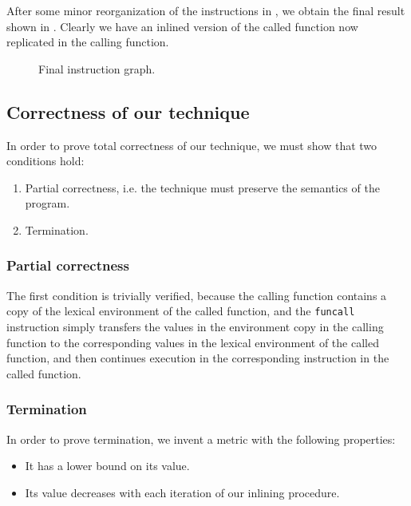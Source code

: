 After some minor reorganization of the instructions in ,
we obtain the final result shown in .  Clearly we have an
inlined version of the called function now replicated in the calling
function.

\begin{figure}
\begin{center}
\end{center}
\caption{\label{fig47}
Final instruction graph.}
\end{figure}

\subsection{Correctness of our technique}

In order to prove total correctness of our technique, we must show
that two conditions hold:

\begin{enumerate}
\item Partial correctness, i.e. the technique must preserve the
  semantics of the program.
\item Termination.
\end{enumerate}

\subsubsection{Partial correctness}

The first condition is trivially verified, because the calling
function contains a copy of the lexical environment of the called
function, and the \texttt{funcall} instruction simply transfers the
values in the environment copy in the calling function to the
corresponding values in the lexical environment of the called
function, and then continues execution in the corresponding
instruction in the called function.

\subsubsection{Termination}

In order to prove termination, we invent a metric with the following
properties:

\begin{itemize}
\item It has a lower bound on its value.
\item Its value decreases with each iteration of our inlining
  procedure.
\end{itemize}

